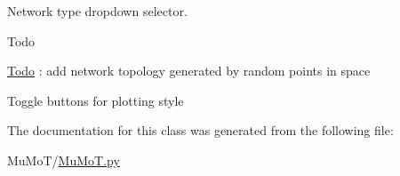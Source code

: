 Network type dropdown selector. 

\begin{DoxyRefDesc}{Todo}
\item[\hyperlink{todo__todo000024}{Todo}]\+: add network topology generated by random points in space \end{DoxyRefDesc}
Toggle buttons for plotting style 

The documentation for this class was generated from the following file\+:\begin{DoxyCompactItemize}
\item 
Mu\+Mo\+T/\hyperlink{_mu_mo_t_8py}{Mu\+Mo\+T.\+py}\end{DoxyCompactItemize}
